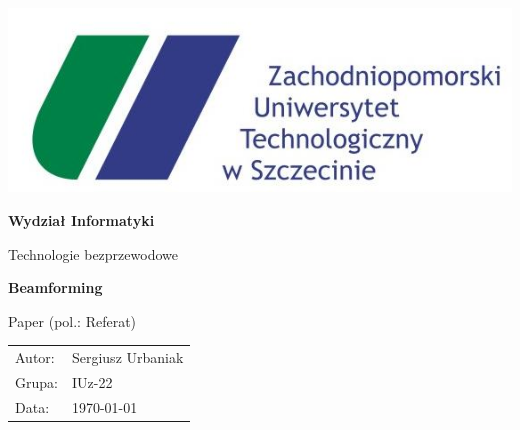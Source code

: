 \documentclass[pointlessnumbers, abstracton, headsepline, a4paper]{scrartcl}
\let\myTOC\tableofcontents
\renewcommand\tableofcontents{\myTOC\clearpage\pagenumbering{arabic}}
\begin{document}
\begin{titlepage}

\begin{center}
\includegraphics[scale=0.5]{logos/zut.jpg}
\par
\end{center}

\begin{center}
\textsf{\textbf{\LARGE Wydział Informatyki}}
\end{center}{\LARGE}

\vspace{1.5cm}

\begin{center}
\textsf{\Large Technologie bezprzewodowe}
\end{center}

\begin{center}
\textsf{\textbf{\Large Beamforming}}
\end{center}

\begin{center}
\textsf{\large Paper (pol.: Referat)}
\end{center}

\vspace{3.5cm}

\begin{center}
\begin{tabular}{ll}
Autor: & Sergiusz Urbaniak\tabularnewline
Grupa: & IUz-22\tabularnewline
Data: & \today\tabularnewline
\end{tabular}
\end{center}

\end{titlepage}





\end{document}
